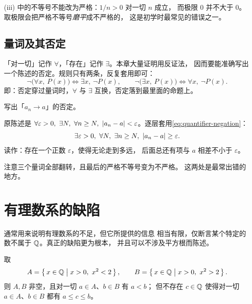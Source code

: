 \begin{pitfall}
  (iii) 中的不等号不能改为严格：\(1/n > 0\) 对一切 \(n\) 成立，
  而极限 \(0\) 并不大于 \(0\)。取极限会把严格不等号\emph{磨平}成不严格的，
  这是初学时最常见的错误之一。
\end{pitfall}

\subsection*{量词及其否定}

「对一切」记作 \(\forall\)，「存在」记作 \(\exists\)。本章大量证明用反证法，
因而要能准确写出一个陈述的否定。规则只有两条，反复套用即可：
\begin{equation}
  \label{eq:quantifier-negation}
  \lnot\bigl(\forall x,\ P(x)\bigr) \iff \exists x,\ \lnot P(x),
  \qquad
  \lnot\bigl(\exists x,\ P(x)\bigr) \iff \forall x,\ \lnot P(x).
\end{equation}
即：否定穿过量词时，\(\forall\) 与 \(\exists\) 互换，否定落到最里面的命题上。

\begin{example}
  \label{ex:negate-convergence}
  写出「\(a_{n} \to a\)」的否定。
  \begin{worked}
    原陈述是 \(\forall \varepsilon>0,\ \exists N,\ \forall n \ge N,\
    \abs{a_{n}-a} < \varepsilon\)。逐层套用\cref{eq:quantifier-negation}：
    \[
      \exists \varepsilon>0,\ \forall N,\ \exists n \ge N,\
      \abs{a_{n}-a} \ge \varepsilon .
    \]
    读作：存在一个正数 \(\varepsilon\)，使得无论走到多远，
    后面总还有项与 \(a\) 相差不小于 \(\varepsilon\)。

    注意三个量词全部翻转，且最后的严格不等号变为不严格。
    这两处是最常出错的地方。
  \end{worked}
\end{example}

\section{有理数系的缺陷}
\label{sec:rational-gap}

 通常用来说明有理数系的不足，但它所提供的信息
相当有限，仅断言某个特定的数不属于 \(\mathbb{Q}\)。真正的缺陷更为根本，
并且可以不涉及平方根而陈述。

\begin{proposition}
  \label{prop:q-cut-fails}
  取
  \begin{equation}
    \label{eq:AB-cut}
    A = \left\{\,x \in \mathbb{Q} \;\middle|\; x > 0,\ x^{2} < 2\,\right\}, \qquad
    B = \left\{\,x \in \mathbb{Q} \;\middle|\; x > 0,\ x^{2} > 2\,\right\}.
  \end{equation}
  则 \(A, B\) 非空，且对一切 \(a \in A\)、\(b \in B\) 有 \(a < b\)；
  但不存在 \(c \in \mathbb{Q}\) 使得对一切 \(a \in A\)、\(b \in B\) 都有 \(a \le c \le b\)。
\end{proposition}

